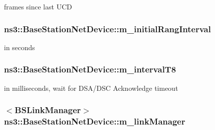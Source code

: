 frames since last U\+CD 

\subsubsection[{\texorpdfstring{m\+\_\+initial\+Rang\+Interval}{m_initialRangInterval}}]{ ns3\+::\+Base\+Station\+Net\+Device\+::m\+\_\+initial\+Rang\+Interval\hspace{0.3cm}{\ttfamily [private]}}\hypertarget{classns3_1_1BaseStationNetDevice_aa3eb316606a9799a9cf39b99a94a7247}{}\label{classns3_1_1BaseStationNetDevice_aa3eb316606a9799a9cf39b99a94a7247}


in seconds 

\subsubsection[{\texorpdfstring{m\+\_\+interval\+T8}{m_intervalT8}}]{ ns3\+::\+Base\+Station\+Net\+Device\+::m\+\_\+interval\+T8\hspace{0.3cm}{\ttfamily [private]}}\hypertarget{classns3_1_1BaseStationNetDevice_ae3319aa5330a4838f03c37c9c076b9cd}{}\label{classns3_1_1BaseStationNetDevice_ae3319aa5330a4838f03c37c9c076b9cd}


in milliseconds, wait for D\+S\+A/\+D\+SC Acknowledge timeout 

\subsubsection[{\texorpdfstring{m\+\_\+link\+Manager}{m_linkManager}}]{$<${\bf B\+S\+Link\+Manager}$>$ ns3\+::\+Base\+Station\+Net\+Device\+::m\+\_\+link\+Manager\hspace{0.3cm}{\ttfamily [private]}}\hypertarget{classns3_1_1BaseStationNetDevice_af69e5b5c16f3fe5d6549cfc21340b7fa}{}\label{classns3_1_1BaseStationNetDevice_af69e5b5c16f3fe5d6549cfc21340b7fa}


